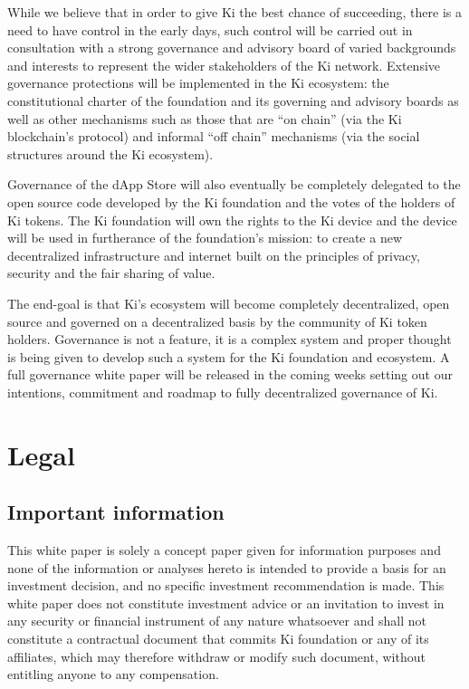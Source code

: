 While we believe that in order to give Ki the best chance of succeeding, there is a need to have control in the early days, such control will be carried out in consultation with a strong governance and advisory board of varied backgrounds and interests to represent the wider stakeholders of the Ki network. Extensive governance protections will be implemented in the Ki ecosystem: the constitutional charter of the foundation and its governing and advisory boards as well as other mechanisms such as those that are “on chain” (via the Ki blockchain's protocol) and informal “off chain” mechanisms (via the social structures around the Ki ecosystem).

Governance of the dApp Store will also eventually be completely delegated to the open source code developed by the Ki foundation and the votes of the holders of Ki tokens. The Ki foundation will own the rights to the Ki device and the device will be used in furtherance of the foundation's mission: to create a new decentralized infrastructure and internet built on the principles of privacy, security and the fair sharing of value.

The end-goal is that Ki's ecosystem will become completely decentralized, open source and governed on a decentralized basis by the community of Ki token holders. Governance is not a feature, it is a complex system and proper thought is being given to develop such a system for the Ki foundation and ecosystem. A full governance white paper will be released in the coming weeks setting out our intentions, commitment and roadmap to fully decentralized governance of Ki.


\section{Legal}
\subsection{Important information}
This white paper is solely a concept paper given for information purposes and none of the information or analyses hereto is intended to provide a basis for an investment decision, and no specific investment recommendation is made. This white paper does not constitute investment advice or an invitation to invest in any security or financial instrument of any nature whatsoever and shall not constitute a contractual document that commits Ki foundation or any of its affiliates, which may therefore withdraw or modify such document, without entitling anyone to any compensation.

